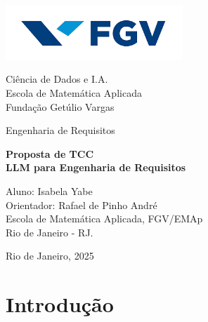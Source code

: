 \documentclass[12pt,a4paper]{article}
\begin{document}
\begin{titlepage}
    \begin{center}
        \vspace*{0cm}
        
            \includegraphics[width=0.5\textwidth]{Images/Logo_FGV.png} 
            
        \vspace{1.5cm}
        \large
        
        Ciência de Dados e I.A.\\
        Escola de Matemática Aplicada\\
        Fundação Getúlio Vargas\\

        \vspace{1cm}  
    
        \Large
        Engenharia de Requisitos
            
        \vspace{2cm}
        
        \vspace{0.25cm}

        \Huge \textbf{Proposta de TCC} \\ 
        \vspace{0.5cm}
        \huge \textbf{LLM para Engenharia de Requisitos}
        \vspace{3.6cm}
        
        \large
                Aluno: Isabela Yabe\\
                Orientador: Rafael de Pinho André\\
                Escola de Matemática Aplicada, FGV/EMAp \\
                Rio de Janeiro - RJ.
        \vfill
            
        \vspace{0.8cm}  
        
        Rio de Janeiro, 2025
            
    \end{center}
\end{titlepage}

\newpage
\tableofcontents

\newpage

\section{Introdução}
\end{document}
